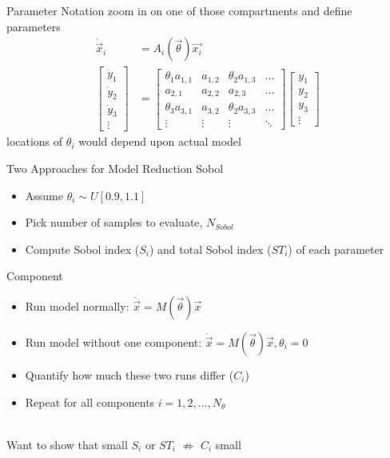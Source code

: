 \documentclass{beamer}
\begin{document}
\begin{frame}{Parameter Notation}
zoom in on one of those compartments and define parameters	
\begin{align}
	\dot{\vec{x}}_i&=A_i(\vec{\theta})\vec{x_i}\\
	\begin{bmatrix}
		\dot{y}_1 \\
		\dot{y}_2 \\
		\dot{y}_3 \\
		\vdots
	\end{bmatrix} &= 
	\begin{bmatrix}
		\theta_1 a_{1,1} & a_{1,2} & \theta_2 a_{1,3} & \ldots\\
		a_{2,1} & a_{2,2} & a_{2,3} & \ldots\\
		\theta_3 a_{3,1} & a_{3,2} & \theta_2 a_{3,3} & \ldots\\
		\vdots & \vdots & \vdots &\ddots
	\end{bmatrix}
	\begin{bmatrix}
		y_1 \\
		y_2 \\
		y_3 \\
		\vdots
	\end{bmatrix}
\end{align}
locations of $\theta_i$ would depend upon actual model
\end{frame}

\begin{frame}{Two Approaches for Model Reduction}
	Sobol
	\begin{itemize}
		\item Assume $\theta_i\sim U[0.9,1.1]$
		\item Pick number of samples to evaluate, $N_{Sobol}$
		\item Compute Sobol index ($S_i$) and total Sobol index ($ST_i$) of each parameter 
	\end{itemize}
	
	Component
	\begin{itemize}
		\item Run model normally: $\dot{\vec{x}}=M(\vec{\theta})\vec{x}$
		\item Run model without one component: $\dot{\vec{x}}=M(\vec{\theta})\vec{x}, \theta_i=0$
		\item Quantify how much these two runs differ ($C_i$)
		\item Repeat for all components $i=1,2,\ldots,N_\theta$
	\end{itemize}
	
	~\\
	
Want to show that small $S_i$ or $ST_i$ $\nRightarrow$ $C_i$ small
\end{frame}
\end{document}
